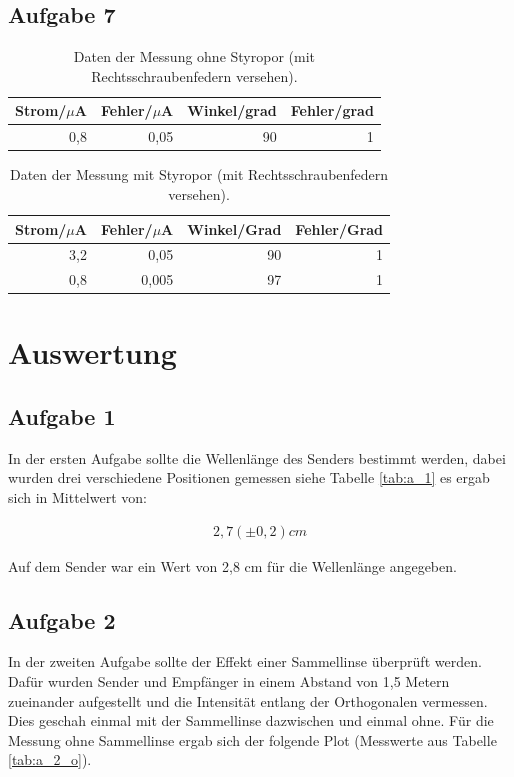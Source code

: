 \documentclass[12pt]{scrartcl}
\begin{document}
\subsection{Aufgabe 7}

\begin{table}[H]
\caption{Daten der Messung ohne Styropor (mit Rechtsschraubenfedern versehen).}
\centering
\begin{tabular}{|l|l|l|l|}
\hline
Strom/$\mu$A & Fehler/$\mu$A & Winkel/grad & Fehler/grad \\ \hline
\multicolumn{1}{|r|}{0,8} & \multicolumn{1}{r|}{0,05} & \multicolumn{1}{r|}{90} & \multicolumn{1}{r|}{1} \\ \hline
\end{tabular}
\label{tab:a_7_o}
\end{table}

\begin{table}[H]
\caption{Daten der Messung mit Styropor (mit Rechtsschraubenfedern versehen).}
\centering
\begin{tabular}{|r|r|r|r|}
\hline
\multicolumn{1}{|l|}{Strom/$\mu$A} & \multicolumn{1}{c|}{Fehler/$\mu$A} & \multicolumn{1}{l|}{Winkel/Grad} & \multicolumn{1}{l|}{Fehler/Grad} \\ \hline
3,2 & 0,05 & 90 & 1 \\ \hline
0,8 & 0,005 & 97 & 1 \\ \hline
\end{tabular}
\label{tab:a_7_m}
\end{table}





\section{Auswertung}
\subsection{Aufgabe 1}
In der ersten Aufgabe sollte die Wellenlänge des Senders bestimmt werden, dabei wurden drei verschiedene Positionen gemessen siehe Tabelle \ref{tab:a_1} es ergab sich in Mittelwert von:

\begin{align*}
2,7 (\pm 0,2) cm
\end{align*}


Auf dem Sender war ein Wert von 2,8 cm für die Wellenlänge angegeben.

\subsection{Aufgabe 2}
In der zweiten Aufgabe sollte der Effekt einer Sammellinse überprüft werden.
Dafür wurden Sender und Empfänger in einem Abstand von 1,5 Metern zueinander aufgestellt und die Intensität entlang der Orthogonalen vermessen. Dies geschah einmal mit der Sammellinse dazwischen und einmal ohne. Für die Messung ohne Sammellinse ergab sich der folgende Plot (Messwerte aus Tabelle \ref{tab:a_2_o}).
\end{document}
